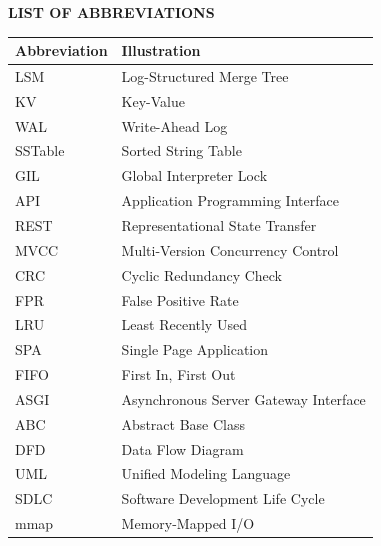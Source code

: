 \documentclass[oneside,a4paper,12pt]{book}
\begin{document}
\newpage
\begin{center}
{\bfseries \fontsize{14}{17}\selectfont LIST OF ABBREVIATIONS}
\end{center}
\vspace*{2\baselineskip}

\renewcommand{\arraystretch}{1.3}
\noindent
\begin{tabularx}{\textwidth}{|p{4cm}|X|}
\hline
\textbf{Abbreviation} & \textbf{Illustration} \\
\hline
LSM & Log-Structured Merge Tree \\
\hline
KV & Key-Value \\
\hline
WAL & Write-Ahead Log \\
\hline
SSTable & Sorted String Table \\
\hline
GIL & Global Interpreter Lock \\
\hline
API & Application Programming Interface \\
\hline
REST & Representational State Transfer \\
\hline
MVCC & Multi-Version Concurrency Control \\
\hline
CRC & Cyclic Redundancy Check \\
\hline
FPR & False Positive Rate \\
\hline
LRU & Least Recently Used \\
\hline
SPA & Single Page Application \\
\hline
FIFO & First In, First Out \\
\hline
ASGI & Asynchronous Server Gateway Interface \\
\hline
ABC & Abstract Base Class \\
\hline
DFD & Data Flow Diagram \\
\hline
UML & Unified Modeling Language \\
\hline
SDLC & Software Development Life Cycle \\
\hline
mmap & Memory-Mapped I/O \\
\hline
\end{tabularx}

\end{document}
